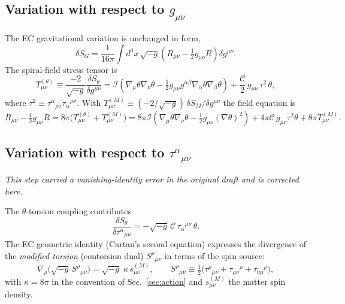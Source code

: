 \documentclass[11pt]{article}
\newcommand{\beq}{\begin{equation}}
\newcommand{\eeq}{\end{equation}}
\newcommand{\I}{\mathcal{I}}
\newcommand{\C}{\mathcal{C}}
\begin{document}
\subsection{Variation with respect to $g_{\mu\nu}$}
\label{sec:metric}
The EC gravitational variation is unchanged in form,
\beq
\delta S_G = \frac{1}{16\pi}\int d^4x\,\sqrt{-g}
  \left(R_{\mu\nu}-\tfrac12 g_{\mu\nu}R\right)\delta g^{\mu\nu}.
\eeq
The spiral-field stress tensor is
\beq
T_{\mu\nu}^{(\theta)} \equiv \frac{-2}{\sqrt{-g}}\frac{\delta S_\theta}{\delta g^{\mu\nu}}
= \I\left(\nabla_\mu\theta\nabla_\nu\theta
  - \tfrac12 g_{\mu\nu}g^{\alpha\beta}\nabla_\alpha\theta\nabla_\beta\theta\right)
  + \frac{\C}{2}\,g_{\mu\nu}\,\tau^2\,\theta ,
\eeq
where $\tau^2\equiv \tau^\alpha{}_{\rho\sigma}\tau_\alpha{}^{\rho\sigma}$. With
$T_{\mu\nu}^{(M)}\equiv (-2/\sqrt{-g})\,\delta S_M/\delta g^{\mu\nu}$ the field equation is
\beq
R_{\mu\nu}-\tfrac12 g_{\mu\nu}R
= 8\pi\Big(T_{\mu\nu}^{(\theta)}+T_{\mu\nu}^{(M)}\Big)
= 8\pi\I\left(\nabla_\mu\theta\nabla_\nu\theta-\tfrac12 g_{\mu\nu}(\nabla\theta)^2\right)
  + 4\pi\C\,g_{\mu\nu}\tau^2\theta + 8\pi T_{\mu\nu}^{(M)} .
\eeq

\subsection{Variation with respect to $\tau^\alpha{}_{\mu\nu}$}\label{sec:torsion}
\emph{This step carried a vanishing-identity error in the original draft and is corrected here.}

The $\theta$-torsion coupling contributes
\beq
\frac{\delta S_\theta}{\delta\tau^\alpha{}_{\mu\nu}}
= -\sqrt{-g}\,\C\,\tau_\alpha{}^{\mu\nu}\,\theta .
\tag{3.1}\label{eq:dsdtau}
\eeq
The EC geometric identity (Cartan's second equation) expresses the divergence of the
\emph{modified torsion} (contorsion dual) $S^{\rho}{}_{\mu\nu}$ in terms of the spin source:
\beq
\nabla_\rho\!\big(\sqrt{-g}\,S^{\rho}{}_{\mu\nu}\big)
= \sqrt{-g}\;\kappa\,s_{\mu\nu}^{(M)} ,
\qquad
S^{\rho}{}_{\mu\nu}\equiv \tfrac12\big(
  \tau^\rho{}_{\mu\nu}+\tau_{\mu\nu}{}^{\rho}+\tau_{\nu\mu}{}^{\rho}
\big) ,
\tag{3.2}\label{eq:cartan}
\eeq
with $\kappa=8\pi$ in the convention of Sec.~\ref{sec:action} and $s_{\mu\nu}^{(M)}$ the
matter spin density.
\end{document}
